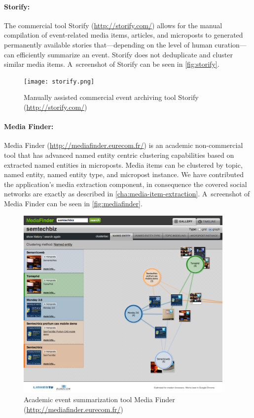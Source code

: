 \paragraph{Storify:}

The commercial tool Storify (\url{http://storify.com/})
allows for the manual compilation of
event-related media items, articles, and microposts
to generated permanently available stories
that---depending on the level of human curation---%
can efficiently summarize an event.
Storify does not deduplicate and cluster
similar media items.
A~screenshot of Storify can be seen in \autoref{fig:storify}.

\begin{figure}
  \centering
  \texttt{[image: storify.png]}
  \caption[Manually assisted commercial event archiving tool Storify]{Manually assisted commercial event archiving tool Storify
    (\url{http://storify.com/})}
  \label{fig:storify}
\end{figure}

\paragraph{Media Finder:}

Media Finder (\url{http://mediafinder.eurecom.fr/})
is an academic non-commercial tool that
has advanced named entity centric clustering capabilities
based on extracted named entities in microposts.
Media items can be clustered by topic, named entity,
named entity type, and micropost instance.
We have contributed the application's media extraction component,
in consequence the covered social networks
are exactly as described in \autoref{cha:media-item-extraction}.
A~screenshot of Media Finder can be seen in \autoref{fig:mediafinder}.

\begin{figure}
  \centering
  \includegraphics[width=0.95\textwidth,height=0.9\textheight,keepaspectratio]{mediafinder.png}
  \caption[Academic event summarization tool Media Finder]{Academic event summarization tool Media Finder (\url{http://mediafinder.eurecom.fr/})}
  \label{fig:mediafinder}
\end{figure}

